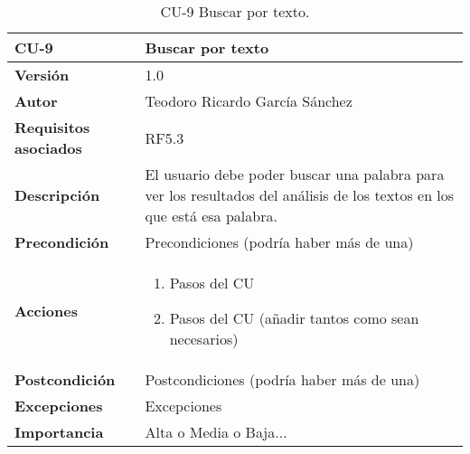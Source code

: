 \begin{table}[p]
	\centering
	\begin{tabularx}{\linewidth}{ p{} p{} }
		\toprule
		\textbf{CU-9}    & \textbf{Buscar por texto}\\
		\toprule
		\textbf{Versión}              & 1.0    \\
		\textbf{Autor}                & Teodoro Ricardo García Sánchez \\
		\textbf{Requisitos asociados} & RF5.3 \\
		\textbf{Descripción}          & El usuario debe poder buscar una palabra para ver los resultados del análisis de los textos en los que está esa palabra. \\
		\textbf{Precondición}         & Precondiciones (podría haber más de una) \\
		\textbf{Acciones}             &
		\begin{enumerate}
			\def\labelenumi{\arabic{enumi}.}
			\tightlist
			\item Pasos del CU
			\item Pasos del CU (añadir tantos como sean necesarios)
		\end{enumerate}\\
		\textbf{Postcondición}        & Postcondiciones (podría haber más de una) \\
		\textbf{Excepciones}          & Excepciones \\
		\textbf{Importancia}          & Alta o Media o Baja... \\
		\bottomrule
	\end{tabularx}
	\caption{CU-9 Buscar por texto.}
\end{table}
